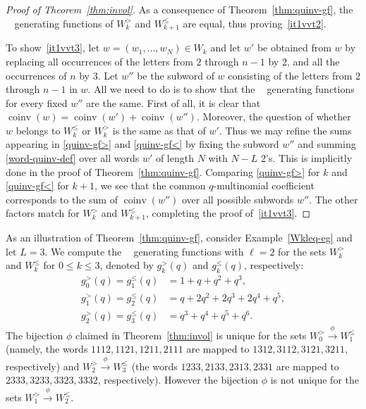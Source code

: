 \documentclass[ALCO,Unicode]{cedram}
\DeclareMathOperator{\coinv}{coinv}
\DeclareMathOperator{\quinvL}{\quinv^{(\ell)}}
\DeclareMathOperator{\quinv}{quinv}
\begin{document}
\begin{proof}[Proof of Theorem~\ref{thm:invol}]
As a consequence of Theorem~\ref{thm:quinv-gf}, the $\quinvL$ generating functions of $W_{k}^>$ and $W_{k+1}^\leq$ are equal, thus proving~\ref{it1vvt2}. 

To show~\ref{it1vvt3}, let $w = (w_1, \dots, w_N) \in W_k$ and let $w'$ be obtained from $w$ by replacing all
occurrences of the letters from $2$ through $n-1$ by $2$, and all the occurrences of $n$ by $3$.
Let $w''$ be the subword of $w$ consisting of the letters from $2$ through $n-1$ in $w$. 
All we need to do is to show that the $\quinvL$ generating functions for every fixed $w''$ are the same.
First of all, it is clear that $\coinv(w) = \coinv(w') + \coinv(w'')$.  Moreover, the question of whether $w$
belongs to $W_k^\leq$ or $W_k^>$ is the same as that of $w'$. 
Thus we may refine the sums appearing in \eqref{quinv-gf>} and \eqref{quinv-gf<} by fixing the subword $w''$ and summing \eqref{word-quinv-def} over all words $w'$ of length $N$ with $N-L$ $2$'s.
This is implicitly done in the proof of Theorem~\ref{thm:quinv-gf}. Comparing \eqref{quinv-gf>} for $k$ and \eqref{quinv-gf<} for $k+1$, we see that the common $q$-multinomial coefficient corresponds to the sum of $\coinv(w'')$ over all possible subwords $w''$. The other factors match for $W_k^>$ and $W_{k+1}^\leq$, completing the proof of~\ref{it1vvt3}.
\end{proof}


\begin{example}
\label{eg:W<>}
As an illustration of Theorem~\ref{thm:quinv-gf}, consider Example~\ref{Wkleq-eg} and let $L= 3$. We compute the $\quinvL$ generating functions with $\ell = 2$ for the sets $W_k^>$ and $W_k^\leq$ for $0\leq k\leq 3$, denoted by $g_k^>(q)$ and $g_k^\leq(q)$, respectively:
\begin{equation*}
\begin{split}
g_0^>(q)=g_1^\leq(q)&=1+q+q^2+q^3,\\
g_1^>(q)=g_2^\leq(q)&=q+2q^2+2q^3+2q^4+q^5,\\
g_2^>(q)=g_3^\leq(q)&=q^3+q^4+q^5+q^6.
\end{split}
\end{equation*}
The bijection $\phi$ claimed in Theorem~\ref{thm:invol} is unique for the sets $W_0^> \xrightarrow{\phi} W_1^\leq$ (namely, the words $1112,1121,1211,2111$ are mapped to $1312,3112,3121,3211$, respectively) and $W_2^> \xrightarrow{\phi} W_3^\leq$ (the words $1233,2133,2313,2331$ are mapped to\linebreak $2333,3233,3323,3332$, respectively). However the bijection $\phi$ is not unique for the sets $W_1^> \xrightarrow{\phi} W_2^\leq$.
\end{example}
\end{document}
